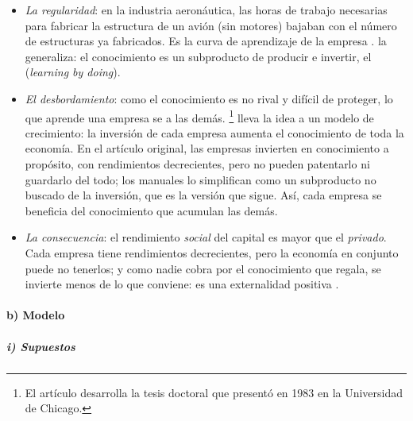 \documentclass[11pt]{article}
\begin{document}
\begin{itemize}
\item \emph{La regularidad}: en la industria aeronáutica, las horas de trabajo necesarias para fabricar la estructura de un avión (sin motores) bajaban con el número de estructuras ya fabricados\nocite{Wright1936}. Es la curva de aprendizaje de la empresa . \textcite{Arrow1962Learning} la generaliza: el conocimiento es un subproducto de producir e invertir, el  (\emph{learning by doing}).
\item \emph{El desbordamiento}: como el conocimiento es no rival y difícil de proteger, lo que aprende una empresa se  a las demás. \textcite{Romer1986Increasing}\footnote{El artículo desarrolla la tesis doctoral que  presentó en 1983 en la Universidad de Chicago\nocite{Romer1983}.} lleva la idea a un modelo de crecimiento: la inversión de cada empresa aumenta el conocimiento de toda la economía. En el artículo original, las empresas invierten en conocimiento a propósito, con rendimientos decrecientes, pero no pueden patentarlo ni guardarlo del todo; los manuales lo simplifican como un subproducto no buscado de la inversión, que es la versión que sigue\nocite{Romer1986Increasing}. Así, cada empresa se beneficia del conocimiento que acumulan las demás.
\item \emph{La consecuencia}: el rendimiento \emph{social} del capital es mayor que el \emph{privado}. Cada empresa tiene rendimientos decrecientes, pero la economía en conjunto puede no tenerlos; y como nadie cobra por el conocimiento que regala, se invierte menos de lo que conviene: es una externalidad positiva .
\end{itemize}

\paragraph{b) Modelo}

\subparagraph{i) Supuestos}
\end{document}

